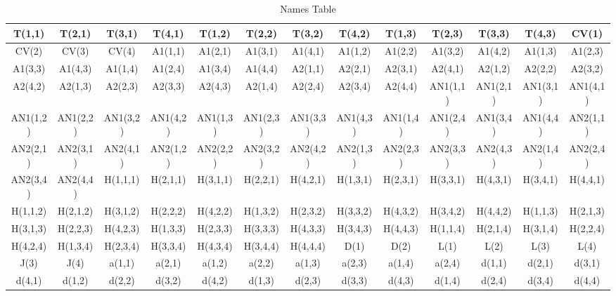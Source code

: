 \documentclass{article}
\begin{document}
\begin{table}[htb]
\centering
\begin{tabular}{ccccccccccccc}\toprule
T(1,1) & T(2,1) & T(3,1) & T(4,1) & T(1,2) & T(2,2) & T(3,2) & T(4,2) & T(1,3) & T(2,3) & T(3,3) & T(4,3) & CV(1) \\
\midrule
CV(2) & CV(3) & CV(4) & A{1}(1,1) & A{1}(2,1) & A{1}(3,1) & A{1}(4,1) & A{1}(1,2) & A{1}(2,2) & A{1}(3,2) & A{1}(4,2) & A{1}(1,3) & A{1}(2,3) \\
\midrule
A{1}(3,3) & A{1}(4,3) & A{1}(1,4) & A{1}(2,4) & A{1}(3,4) & A{1}(4,4) & A{2}(1,1) & A{2}(2,1) & A{2}(3,1) & A{2}(4,1) & A{2}(1,2) & A{2}(2,2) & A{2}(3,2) \\
\midrule
A{2}(4,2) & A{2}(1,3) & A{2}(2,3) & A{2}(3,3) & A{2}(4,3) & A{2}(1,4) & A{2}(2,4) & A{2}(3,4) & A{2}(4,4) & AN{1}(1,1) & AN{1}(2,1) & AN{1}(3,1) & AN{1}(4,1) \\
\midrule
AN{1}(1,2) & AN{1}(2,2) & AN{1}(3,2) & AN{1}(4,2) & AN{1}(1,3) & AN{1}(2,3) & AN{1}(3,3) & AN{1}(4,3) & AN{1}(1,4) & AN{1}(2,4) & AN{1}(3,4) & AN{1}(4,4) & AN{2}(1,1) \\
\midrule
AN{2}(2,1) & AN{2}(3,1) & AN{2}(4,1) & AN{2}(1,2) & AN{2}(2,2) & AN{2}(3,2) & AN{2}(4,2) & AN{2}(1,3) & AN{2}(2,3) & AN{2}(3,3) & AN{2}(4,3) & AN{2}(1,4) & AN{2}(2,4) \\
\midrule
AN{2}(3,4) & AN{2}(4,4) & H(1,1,1) & H(2,1,1) & H(3,1,1) & H(2,2,1) & H(4,2,1) & H(1,3,1) & H(2,3,1) & H(3,3,1) & H(4,3,1) & H(3,4,1) & H(4,4,1) \\
\midrule
H(1,1,2) & H(2,1,2) & H(3,1,2) & H(2,2,2) & H(4,2,2) & H(1,3,2) & H(2,3,2) & H(3,3,2) & H(4,3,2) & H(3,4,2) & H(4,4,2) & H(1,1,3) & H(2,1,3) \\
\midrule
H(3,1,3) & H(2,2,3) & H(4,2,3) & H(1,3,3) & H(2,3,3) & H(3,3,3) & H(4,3,3) & H(3,4,3) & H(4,4,3) & H(1,1,4) & H(2,1,4) & H(3,1,4) & H(2,2,4) \\
\midrule
H(4,2,4) & H(1,3,4) & H(2,3,4) & H(3,3,4) & H(4,3,4) & H(3,4,4) & H(4,4,4) & D(1) & D(2) & L(1) & L(2) & L(3) & L(4) \\
\midrule
J(3) & J(4) & a(1,1) & a(2,1) & a(1,2) & a(2,2) & a(1,3) & a(2,3) & a(1,4) & a(2,4) & d(1,1) & d(2,1) & d(3,1) \\
\midrule
d(4,1) & d(1,2) & d(2,2) & d(3,2) & d(4,2) & d(1,3) & d(2,3) & d(3,3) & d(4,3) & d(1,4) & d(2,4) & d(3,4) & d(4,4) \\
\bottomrule
\end{tabular}
\caption{Names Table}
\end{table}
\end{document}
